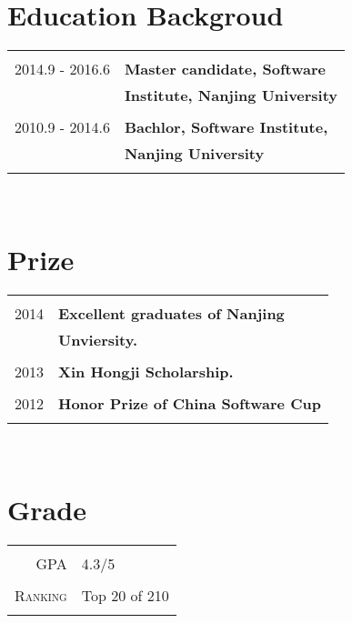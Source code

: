 \documentclass[10pt]{article} %
\begin{document}
\begin{minipage}[t]{0.32\textwidth}
\section{Education Backgroud} 

\begin{tabular}{rl}
& \\
2014.9 - 2016.6  & \textbf{ Master candidate, Software }\\
 & \textbf{Institute, Nanjing University}\\
& \\
2010.9 - 2014.6  & \textbf{ Bachlor, Software Institute, }\\
 & \textbf{Nanjing University}\\ 
& \\
\end{tabular}\\[10pt]


\section{Prize} 

\begin{tabular}{rl}
& \\
2014  & \textbf{Excellent graduates of Nanjing}\\
& \textbf{ Unviersity.}\\
& \\
2013  & \textbf{Xin Hongji Scholarship.}\\
& \\
2012	 & \textbf{Honor Prize of China Software Cup}\\
& \\
\end{tabular}\\[10pt]



\section{Grade} 

\begin{tabular}{rl}
& \\
\textsc{GPA}
& 4.3/5 \\
& \\
\textsc{Ranking}
& Top 20 of 210 \\
& \\
\end{tabular}\\[10pt]


\end{minipage}
\end{document}
